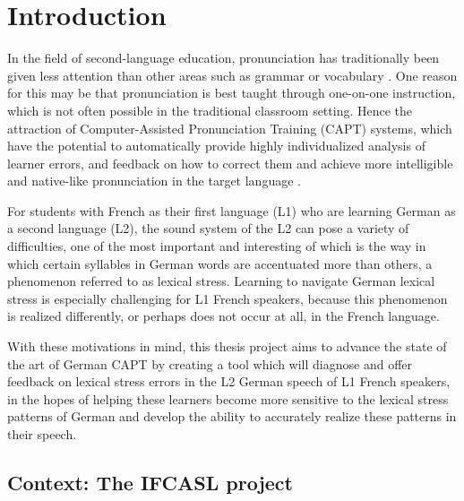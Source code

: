%
%
\chapter{Introduction}
\label{chap:intro}


In the field of second-language education, pronunciation has traditionally been given less attention than other areas such as grammar or vocabulary \citep{Derwing2005}. One reason for this may be that pronunciation is best taught through one-on-one instruction, which is not often possible in the traditional classroom setting. Hence the attraction of Computer-Assisted Pronunciation Training (CAPT) systems, which have the potential to automatically provide highly individualized analysis of learner errors, and feedback on how to correct them and achieve more intelligible and native-like pronunciation in the target language \citep{Witt2012}. 


For students with French as their first language (L1) who are learning German as a second language (L2), the sound system of the L2 can pose a variety of difficulties, one of the most important and interesting of which is the way in which certain syllables in German words are accentuated more than others, a phenomenon referred to as lexical stress. Learning to navigate German lexical stress is especially challenging for L1 French speakers, because this phenomenon is realized differently, or perhaps does not occur at all, in the French language. 

With these motivations in mind, this thesis project aims to advance the state of the art of German CAPT %
by creating a tool which will diagnose and offer feedback on lexical stress errors in the L2 German speech of L1 French speakers, in the hopes of helping these learners become more sensitive to the lexical stress patterns of German and develop the ability to accurately realize these patterns in their speech. 

\section{Context: The IFCASL project}
\label{sec:intro:ifcasl}

